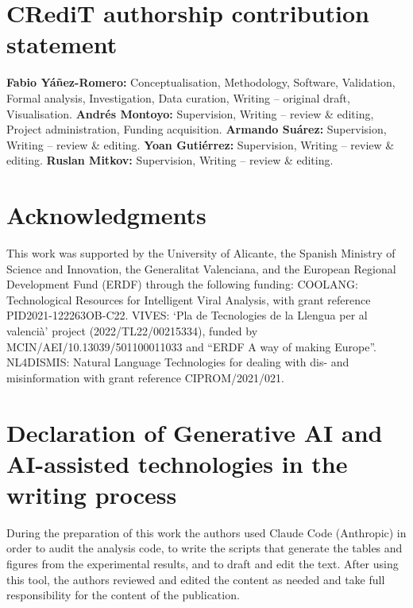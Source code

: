 \documentclass[preprint, times, review, 10pt]{elsarticle}
\begin{document}
\section*{CRediT authorship contribution statement}

\textbf{Fabio Y\'{a}\~{n}ez-Romero:} Conceptualisation, Methodology, Software, Validation, Formal analysis, Investigation, Data curation, Writing -- original draft, Visualisation.
\textbf{Andr\'{e}s Montoyo:} Supervision, Writing -- review \& editing, Project administration, Funding acquisition.
\textbf{Armando Su\'{a}rez:} Supervision, Writing -- review \& editing.
\textbf{Yoan Guti\'{e}rrez:} Supervision, Writing -- review \& editing.
\textbf{Ruslan Mitkov:} Supervision, Writing -- review \& editing.


\section*{Acknowledgments}
\begin{sloppypar}This work was supported by the University of Alicante, the Spanish Ministry of Science and Innovation, the Generalitat Valenciana, and the European Regional Development Fund (ERDF) through the following funding: COOLANG: Technological Resources for Intelligent Viral Analysis, with grant reference PID2021-122263OB-C22. VIVES: ‘Pla de Tecnologies de la Llengua per al valencià’ project (2022\slash TL22\slash 00215334), funded by MCIN\slash AEI\slash 10.13039\slash 501100011033 and “ERDF A way of making Europe”. NL4DISMIS: Natural Language Technologies for dealing with dis- and misinformation with grant reference CIPROM\slash 2021\slash 021.\end{sloppypar}


\section*{Declaration of Generative AI and AI-assisted technologies in the writing process}

During the preparation of this work the authors used Claude Code (Anthropic) in order to audit the analysis code, to write the scripts that generate the tables and figures from the experimental results, and to draft and edit the text. After using this tool, the authors reviewed and edited the content as needed and take full responsibility for the content of the publication.





\setlength{\bibsep}{0pt}



\end{document}
